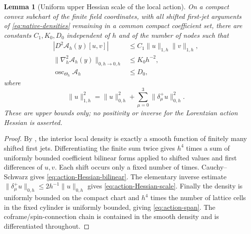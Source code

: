 \documentclass[11pt]{article}
\numberwithin{equation}{section}
\newtheorem{lemma}[lemma]{Lemma}
\theoremstyle{definition}
\theoremstyle{remark}
\newcommand{\norm}[1]{\lVert#1\rVert}
\begin{document}
\begin{lemma}[Uniform upper Hessian scale of the local action]
\label{lem:native-action-Hessian}
On a compact convex subchart of the finite field coordinates, with all shifted first-jet arguments of \eqref{eq:native-densities} remaining in a common compact coefficient set, there are constants $C_1,K_0,D_0$ independent of $h$ and of the number of nodes such that
\begin{align}
 |D^2\mathcal A_h(y)[u,v]|&\le C_1\norm u_{1,h}\norm v_{1,h},\label{eq:action-Hessian-bilinear}\\
 \norm{\nabla_h^2\mathcal A_h(y)}_{0,h\to0,h}&\le K_0h^{-2},\label{eq:action-Hessian-scale}\\
 \operatorname{osc}_{\Theta_h}\mathcal A_h&\le D_0,\label{eq:action-span}
\end{align}
where
\[
 \norm u_{1,h}^2=\norm u_{0,h}^2
 +\sum_{\mu=0}^3\norm{\delta_\mu^+u}_{0,h}^2.
\]
These are upper bounds only; no positivity or inverse for the Lorentzian action Hessian is asserted.
\end{lemma}
\begin{proof}
By , the interior local density is exactly a smooth function of finitely many shifted first jets.  Differentiating the finite sum twice gives $h^4$ times a sum of uniformly bounded coefficient bilinear forms applied to shifted values and first differences of $u,v$.  Each shift occurs only a fixed number of times.  Cauchy--Schwarz gives \eqref{eq:action-Hessian-bilinear}.  The elementary inverse estimate $\norm{\delta_\mu^+u}_{0,h}\le2h^{-1}\norm u_{0,h}$ gives \eqref{eq:action-Hessian-scale}.  Finally the density is uniformly bounded on the compact chart and $h^4$ times the number of lattice cells in the fixed cylinder is uniformly bounded, giving \eqref{eq:action-span}.  The coframe/spin-connection chain is contained in the smooth density and is differentiated throughout.
\end{proof}
\end{document}

